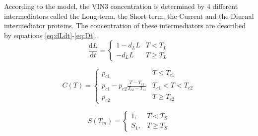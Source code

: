 \documentclass[11pt, a4paper]{article}
\begin{document}
According to the model, the VIN3 concentration is determined by 4 different intermediators
called the Long-term, the Short-term, the Current and the Diurnal intermediator proteins.
The concentration of these intermediators are described by equations \ref{eq:dLdt}-\ref{eq:Dt}.
\begin{equation}
    \frac{\mathrm dL}{\mathrm dt} =
    \begin{cases}
    1-d_LL & T < T_L \\
    -d_LL & T \geq T_L
    \end{cases}
    \label{eq:dLdt}
\end{equation}

\begin{equation}
    C(T) =
    \begin{cases}
    p_{c1} & T \leq T_{c1} \\
    p_{c1}-p_{c2}\frac{T-T_{c1}}{T_{c2}-T_{c1}} & T_{c1} < T < T_{c2} \\
    p_{c2} & T \geq T_{c2}
    \end{cases}
    \label{eq:CT}
\end{equation}

\begin{equation}
    S(T_m) = 
    \begin{cases}
    1, & T < T_S \\
    S_1, & T \geq T_S
    \end{cases}
    \label{eq:STm}
\end{equation}
\end{document}

